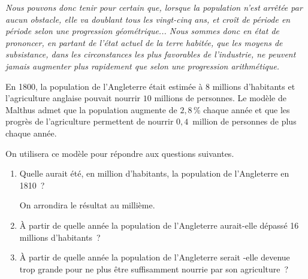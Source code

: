 \begin{enumerate}
\begin{center}
{               \og \emph{Nous pouvons donc tenir pour certain que, lorsque la population n'est arrêtée par aucun obstacle, elle va doublant tous les vingt-cinq ans, et croît de période en période selon une progression géométrique...
               Nous sommes donc en état de prononcer, en partant de l'état actuel de la terre habitée, que les moyens de subsistance, dans les circonstances les plus favorables de l'industrie, ne peuvent jamais augmenter plus rapidement que selon une progression arithmétique.}\fg
          }
     \end{center}
     En 1800, la population de l'Angleterre était estimée à $8$ millions d'habitants et l'agriculture anglaise pouvait nourrir $10$ millions de personnes. Le modèle de Malthus admet que la population augmente de $2,8$\,\% chaque année et que les progrès de l'agriculture permettent de nourrir $0,4$~million de personnes de plus chaque année.
     \par
     On utilisera ce modèle pour répondre aux questions suivantes.
     \begin{enumerate}[label=\alph*.]
          \item Quelle aurait été, en million d'habitants, la population de l'Angleterre en 1810~?
          \par
          On arrondira le résultat au millième.
          \item À partir de quelle année la population de l'Angleterre aurait-elle dépassé 16 millions
          d'habitants~?
          \item À partir de quelle année la population de l'Angleterre serait -elle devenue trop grande pour ne plus être suffisamment nourrie par son agriculture~?
     \end{enumerate}
\end{enumerate}

